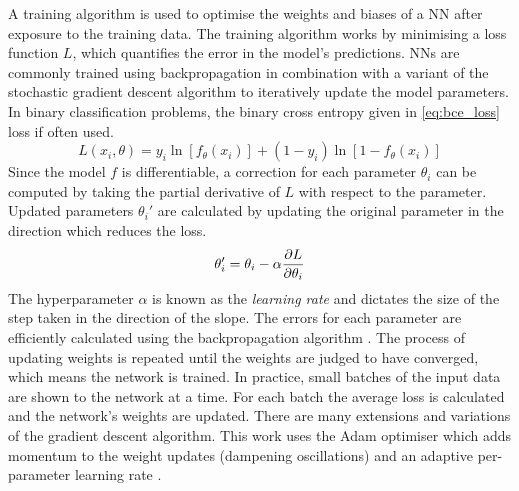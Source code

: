 A training algorithm is used to optimise the weights and biases of a NN after exposure to the training data.
The training algorithm works by minimising a loss function $L$, which quantifies the error in the model's predictions.
NNs are commonly trained using backpropagation in combination with a variant of the stochastic gradient descent algorithm to iteratively update the model parameters.
In binary classification problems, the binary cross entropy given in \cref{eq:bce_loss} loss if often used.
%
\begin{equation}\label{eq:bce_loss}
  L(x_i, \theta) = y_i \ln[f_\theta(x_i)] + (1 - y_i) \ln[1 - f_\theta(x_i)]
\end{equation}
%
Since the model $f$ is differentiable, a correction for each parameter $\theta_i$ can be computed by taking the partial derivative of $L$ with respect to the parameter.
Updated parameters $\theta_i'$ are calculated by updating the original parameter in the direction which reduces the loss.
%
\begin{equation}\label{eq:weight_update}
  \theta_i' = \theta_i - \alpha \frac{\partial {L}}{\partial \theta_i}
\end{equation}
%
The hyperparameter $\alpha$ is known as the \textit{learning rate} and dictates the size of the step taken in the direction of the slope. 
The errors for each parameter are efficiently calculated using the backpropagation algorithm \cite{rumelhart1986learning}.
The process of updating weights is repeated until the weights are judged to have converged, which means the network is trained.
In practice, small batches of the input data are shown to the network at a time. For each batch the average loss is calculated and the network's weights are updated.
There are many extensions and variations of the gradient descent algorithm.
This work uses the Adam optimiser which adds momentum to the weight updates (dampening oscillations) and an adaptive per-parameter learning rate \cite{2014arXiv1412.6980K}.

